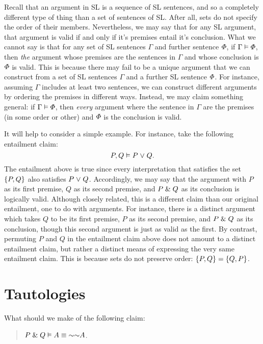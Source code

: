 Recall that an argument in SL is a sequence of SL sentences, and so a completely different type of thing than a set of sentences of SL.
After all, sets do not specify the order of their members.
Nevertheless, we may say that for any SL argument, that argument is valid if and only if it's premises entail it's conclusion.
What we cannot say is that for any set of SL sentences $\Gamma$ and further sentence $\varPhi$, if $\Gamma \vDash \varPhi$, then \textit{the} argument whose premises are the sentences in $\Gamma$ and whose conclusion is $\varPhi$ is valid.
This is because there may fail to be a unique argument that we can construct from a set of SL sentences $\Gamma$ and a further SL sentence $\varPhi$.
For instance, assuming $\Gamma$ includes at least two sentences, we can construct different arguments by ordering the premises in different ways.
Instead, we may claim something general: if $\Gamma \vDash \varPhi$, then \textit{every} argument where the sentence in $\Gamma$ are the premises (in some order or other) and $\varPhi$ is the conclusion is valid.

It will help to consider a simple example.
For instance, take the following entailment claim: 
  $$P, Q \vDash P\mkern1mu\vee\mkern1mu Q.$$ 
The entailment above is true since every interpretation that satisfies the set $\lbrace P, Q\rbrace$ also satisfies $P\mkern1mu\vee\mkern1mu Q$.
Accordingly, we may say that the argument with $P$ as its first premise, $Q$ as its second premise, and $P\mathrel\& Q$ as its conclusion is logically valid. 
Although closely related, this is a different claim than our original entailment, one to do with arguments.
For instance, there is a distinct argument which takes $Q$ to be its first premise, $P$ as its second premise, and $P\mathrel\& Q$ as its conclusion, though this second argument is just as valid as the first.
By contrast, permuting $P$ and $Q$ in the entailment claim above does not amount to a distinct entailment claim, but rather a distinct means of expressing the very same entailment claim. 
This is because sets do not preserve order: $\lbrace P,Q\rbrace=\lbrace Q,P\rbrace$.




\section{Tautologies}

What should we make of the following claim:

\begin{quote}
  $P\eand Q \models A\eiff\enot\enot A$.
\end{quote}


